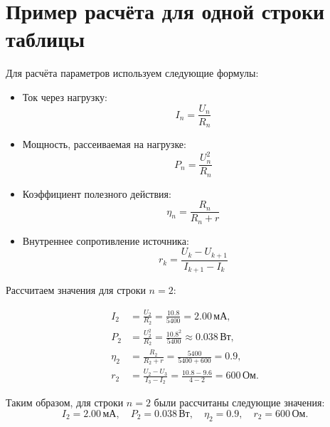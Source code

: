 \newpage
\section{Пример расчёта для одной строки таблицы}

Для расчёта параметров используем следующие формулы:

\begin{itemize}
	\item Ток через нагрузку:
	      \[
		      I_n = \frac{U_n}{R_n}
	      \]

	\item Мощность, рассеиваемая на нагрузке:
	      \[
		      P_n = \frac{U_n^2}{R_n}
	      \]

	\item Коэффициент полезного действия:
	      \[
		      \eta_n = \frac{R_n}{R_n + r}
	      \]

	\item Внутреннее сопротивление источника:
	      \[
		      r_k = \frac{U_k - U_{k+1}}{I_{k+1} - I_k}
	      \]
\end{itemize}

Рассчитаем значения для строки \(n = 2\):

\begin{align*}
	I_2    & = \frac{U_2}{R_2} = \frac{10.8}{5400} = 2.00 \, \text{мА},                           \\
	P_2    & = \frac{U_2^2}{R_2} = \frac{10.8^2}{5400} \approx 0.038 \, \text{Вт},                \\
	\eta_2 & = \frac{R_2}{R_2 + r} = \frac{5400}{5400 + 600} = 0.9,                                 \\
	r_2    & = \frac{U_2 - U_3}{I_3 - I_2} = \frac{10.8 - 9.6}{4 - 2} = 600 \, \text{Ом}.
\end{align*}

Таким образом, для строки \(n = 2\) были рассчитаны следующие значения:
\[
	I_2 = 2.00 \, \text{мА}, \quad P_2 = 0.038 \, \text{Вт}, \quad \eta_2 = 0.9, \quad r_2 = 600 \, \text{Ом}.
\]
